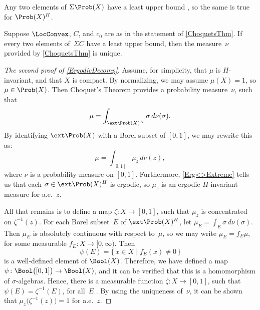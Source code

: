 \begin{eg} \label{ProbUB}
Any two elements of $\Sigma \Prob(X)$ have a least upper bound , so the same is true for $\Prob(X)^H$.
\end{eg}

\begin{thm}[(Choquet)]
Suppose $\LocConvex$, $C$, and $c_0$ are as in the statement of \cref{ChoquetsThm}. If every two elements of~$\Sigma C$ have a least upper bound, then the measure~$\nu$ provided by \cref{ChoquetsThm} is unique.
\end{thm}

\begin{proof}[The second proof of \cref{ErgodicDecomp}]
Assume, for simplicity, that $\mu$ is $H$-invariant, and that $X$ is compact. By normalizing, we may assume $\mu(X) = 1$, so $\mu \in \Prob(X)$. Then Choquet's Theorem  provides a probability measure~$\nu$, such that 
	$$ \mu = \int_{\ext \Prob(X)^H} \sigma \, d\nu(\sigma) .$$
By identifying $\ext \Prob(X)$ with a Borel subset of $[0,1]$, we may rewrite this as:
	$$ \mu = \int_{[0,1]} \mu_z \, d\nu(z) ,$$
where $\nu$ is a probability measure on $[0,1]$. Furthermore, \cref{Erg<>Extreme} tells us that each $\sigma \in \ext \Prob(X)^H$ is ergodic, so $\mu_z$ is an ergodic $H$-invariant measure for a.e.~$z$.

All that remains is to define a map $\zeta \colon X \to [0,1]$, such that $\mu_z$ is concentrated on $\zeta^{-1}(z)$.
For each Borel subset~$E$ of $\ext \Prob(X)^H$, let $\mu_E = \int_E \sigma \, d\nu(\sigma)$. Then $\mu_E$ is absolutely continuous with respect to~$\mu$, so we may write $\mu_E = f_E \mu$, for some measurable $f_E \colon X \to [0,\infty)$. Then 
	$$\psi(E) = \{\, x \in X \mid f_E(x) \neq 0 \,\}$$
is a well-defined element of $\Bool(X)$. Therefore, we have defined a map $\psi \colon \Bool \bigl( [0,1] \bigr) \to \Bool(X)$, and it can be verified that this is a homomorphism of $\sigma$-algebras. Hence, there is a measurable function $\zeta \colon X \to [0,1]$, such that $\psi(E) = \zeta^{-1}(E)$, for all~$E$ .
By using the uniqueness of~$\nu$, it can be shown that $\mu_z \bigl( \zeta^{-1}(z) \bigr) = 1$ for a.e.~$z$.
\end{proof}

